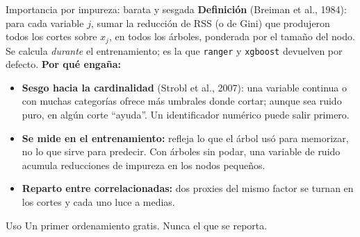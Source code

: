 \documentclass{beamer}
\newcommand{\1}{\mathbb{I}}
\begin{document}
\begin{frame}{Importancia por impureza: barata y sesgada}
\small
\textbf{Definición} (Breiman et al., 1984): para cada variable $j$, sumar la reducción de RSS (o de Gini) que produjeron todos los cortes sobre $x_j$, en todos los árboles, ponderada por el tamaño del nodo. Se calcula \emph{durante} el entrenamiento; es la que \texttt{ranger} y \texttt{xgboost} devuelven por defecto.
\pause
\vspace{0.1cm}
\textbf{Por qué engaña:}
\begin{itemize}\itemsep3pt
  \item \textbf{Sesgo hacia la cardinalidad} (Strobl et al., 2007): una variable continua o con muchas categorías ofrece más umbrales donde cortar; aunque sea ruido puro, en algún corte ``ayuda''. Un identificador numérico puede salir primero. \pause
  \item \textbf{Se mide en el entrenamiento:} refleja lo que el árbol usó para memorizar, no lo que sirve para predecir. Con árboles sin podar, una variable de ruido acumula reducciones de impureza en los nodos pequeños. \pause
  \item \textbf{Reparto entre correlacionadas:} dos proxies del mismo factor se turnan en los cortes y cada uno luce a medias.
\end{itemize}
\pause
\begin{block}{Uso}
Un primer ordenamiento gratis. Nunca el que se reporta.
\end{block}
\end{frame}
\end{document}
